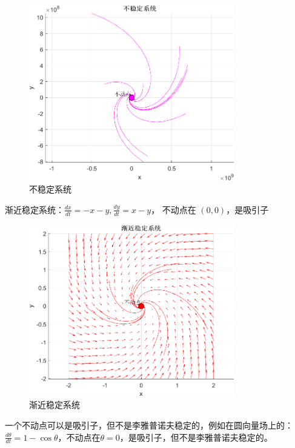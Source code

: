 \begin{figure}[H]
    \centering
    \includegraphics[width=0.8\textwidth]{Img/fix2.png}
    \caption{不稳定系统}
    \label{fig:unstable}
\end{figure}
渐近稳定系统：$\frac{dx}{dt}=-x-y,\frac{dy}{dt}=x-y$， 不动点在 $(0, 0)$，是吸引子
\begin{figure}[H]
    \centering
    \includegraphics[width=0.8\textwidth]{Img/fix3.png}
    \caption{渐近稳定系统}
    \label{fig:asymptotic_stable}
\end{figure}
一个不动点可以是吸引子，但不是李雅普诺夫稳定的，例如在圆向量场上的：$\frac{d\theta}{dt}=1-\cos\theta$，不动点在$\theta=0$，是吸引子，但不是李雅普诺夫稳定的。
